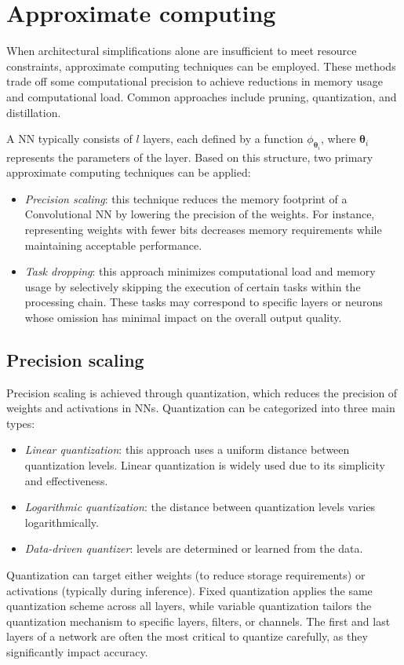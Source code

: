 \section{Approximate computing}

When architectural simplifications alone are insufficient to meet resource constraints, approximate computing techniques can be employed. 
These methods trade off some computational precision to achieve reductions in memory usage and computational load. 
Common approaches include pruning, quantization, and distillation.

A NN typically consists of $l$ layers, each defined by a function $\phi_{\boldsymbol{\theta}_i}$, where $\boldsymbol{\theta}_i$ represents the parameters of the layer.
Based on this structure, two primary approximate computing techniques can be applied:
\begin{itemize}
    \item \textit{Precision scaling}: this technique reduces the memory footprint of a Convolutional NN by lowering the precision of the weights.
        For instance, representing weights with fewer bits decreases memory requirements while maintaining acceptable performance.
    \item \textit{Task dropping}: this approach minimizes computational load and memory usage by selectively skipping the execution of certain tasks within the processing chain.
        These tasks may correspond to specific layers or neurons whose omission has minimal impact on the overall output quality.
\end{itemize}

\subsection{Precision scaling}
Precision scaling is achieved through quantization, which reduces the precision of weights and activations in NNs. 
Quantization can be categorized into three main types:
\begin{itemize}
    \item \textit{Linear quantization}: this approach uses a uniform distance between quantization levels. 
        Linear quantization is widely used due to its simplicity and effectiveness.
    \item \textit{Logarithmic quantization}: the distance between quantization levels varies logarithmically. 
    \item \textit{Data-driven quantizer}: levels are determined or learned from the data. 
\end{itemize}
\noindent Quantization can target either weights (to reduce storage requirements) or activations (typically during inference). 
Fixed quantization applies the same quantization scheme across all layers, while variable quantization tailors the quantization mechanism to specific layers, filters, or channels. 
The first and last layers of a network are often the most critical to quantize carefully, as they significantly impact accuracy.


